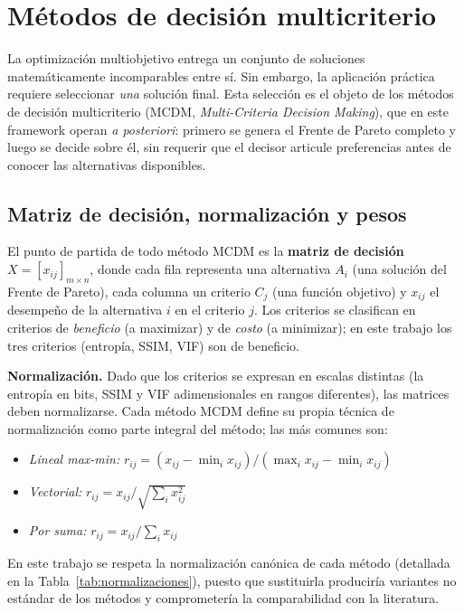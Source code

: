 \section{Métodos de decisión multicriterio}
\label{sec:mcdm}

La optimización multiobjetivo entrega un conjunto de soluciones matemáticamente incomparables entre sí. Sin embargo, la aplicación práctica requiere seleccionar \textit{una} solución final. Esta selección es el objeto de los métodos de decisión multicriterio (MCDM, \textit{Multi-Criteria Decision Making}), que en este framework operan \textit{a posteriori}: primero se genera el Frente de Pareto completo y luego se decide sobre él, sin requerir que el decisor articule preferencias antes de conocer las alternativas disponibles.

\subsection{Matriz de decisión, normalización y pesos}
\label{sec:matriz_decision}

El punto de partida de todo método MCDM es la \textbf{matriz de decisión} $X = [x_{ij}]_{m \times n}$, donde cada fila representa una alternativa $A_i$ (una solución del Frente de Pareto), cada columna un criterio $C_j$ (una función objetivo) y $x_{ij}$ el desempeño de la alternativa $i$ en el criterio $j$. Los criterios se clasifican en criterios de \textit{beneficio} (a maximizar) y de \textit{costo} (a minimizar); en este trabajo los tres criterios (entropía, SSIM, VIF) son de beneficio.

\textbf{Normalización.} Dado que los criterios se expresan en escalas distintas (la entropía en bits, SSIM y VIF adimensionales en rangos diferentes), las matrices deben normalizarse. Cada método MCDM define su propia técnica de normalización como parte integral del método; las más comunes son:

\begin{itemize}
    \item \textit{Lineal max-min:} $r_{ij} = (x_{ij} - \min_i x_{ij}) / (\max_i x_{ij} - \min_i x_{ij})$
    \item \textit{Vectorial:} $r_{ij} = x_{ij} / \sqrt{\sum_i x_{ij}^2}$
    \item \textit{Por suma:} $r_{ij} = x_{ij} / \sum_i x_{ij}$
\end{itemize}

En este trabajo se respeta la normalización canónica de cada método (detallada en la Tabla~\ref{tab:normalizaciones}), puesto que sustituirla produciría variantes no estándar de los métodos y comprometería la comparabilidad con la literatura.

